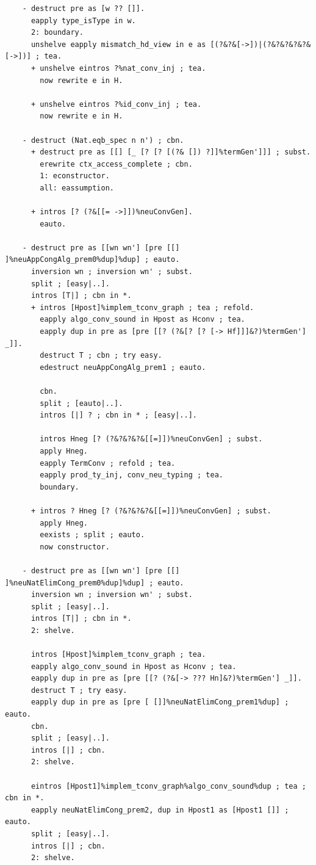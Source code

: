 \documentclass[10pt,a4paper]{amsart}
\begin{document}
\begin{lstlisting}
    - destruct pre as [w ?? []].
      eapply type_isType in w.
      2: boundary.
      unshelve eapply mismatch_hd_view in e as [(?&?&[->])|(?&?&?&?&?&[->])] ; tea.
      + unshelve eintros ?%nat_conv_inj ; tea.
        now rewrite e in H.

      + unshelve eintros ?%id_conv_inj ; tea.
        now rewrite e in H.

    - destruct (Nat.eqb_spec n n') ; cbn.
      + destruct pre as [[] [_ [? [? [(?& []) ?]]%termGen']]] ; subst.
        erewrite ctx_access_complete ; cbn.
        1: econstructor.
        all: eassumption.
        
      + intros [? (?&[[= ->]])%neuConvGen].
        eauto.
      
    - destruct pre as [[wn wn'] [pre [[] ]%neuAppCongAlg_prem0%dup]%dup] ; eauto.
      inversion wn ; inversion wn' ; subst.
      split ; [easy|..].
      intros [T|] ; cbn in *.
      + intros [Hpost]%implem_tconv_graph ; tea ; refold.
        eapply algo_conv_sound in Hpost as Hconv ; tea.
        eapply dup in pre as [pre [[? (?&[? [? [-> Hf]]]&?)%termGen'] _]].
        destruct T ; cbn ; try easy.
        edestruct neuAppCongAlg_prem1 ; eauto.

        cbn.
        split ; [eauto|..].
        intros [|] ? ; cbn in * ; [easy|..].

        intros Hneg [? (?&?&?&?&[[=]])%neuConvGen] ; subst.
        apply Hneg.
        eapply TermConv ; refold ; tea.
        eapply prod_ty_inj, conv_neu_typing ; tea.
        boundary.

      + intros ? Hneg [? (?&?&?&?&[[=]])%neuConvGen] ; subst.
        apply Hneg.
        eexists ; split ; eauto.
        now constructor.
  
    - destruct pre as [[wn wn'] [pre [[] ]%neuNatElimCong_prem0%dup]%dup] ; eauto.
      inversion wn ; inversion wn' ; subst.
      split ; [easy|..].
      intros [T|] ; cbn in *.
      2: shelve.

      intros [Hpost]%implem_tconv_graph ; tea.
      eapply algo_conv_sound in Hpost as Hconv ; tea.
      eapply dup in pre as [pre [[? (?&[-> ??? Hn]&?)%termGen'] _]].
      destruct T ; try easy.
      eapply dup in pre as [pre [ []]%neuNatElimCong_prem1%dup] ; eauto.
      cbn.
      split ; [easy|..].
      intros [|] ; cbn.
      2: shelve.

      eintros [Hpost1]%implem_tconv_graph%algo_conv_sound%dup ; tea ; cbn in *.
      eapply neuNatElimCong_prem2, dup in Hpost1 as [Hpost1 []] ; eauto.
      split ; [easy|..].
      intros [|] ; cbn.
      2: shelve.
      

\end{lstlisting}
\end{document}
